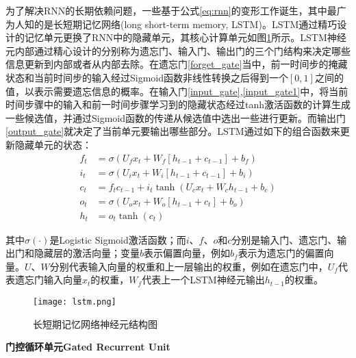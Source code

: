 为了解决RNN的长期依赖问题，一些基于公式\ref{eq:rnn}的变形工作诞生，其中最广为人知的是长短期记忆网络(long short-term memory, LSTM)。LSTM通过精巧设计的记忆单元更换了RNN中的隐藏单元，其核心计算单元如图\ref{fig:lstm}所示。LSTM神经元内部通过精心设计的分别称为遗忘门、输⼊门、输出门的三个门结构来决定哪些信息更新到内部或者从内部去除。在遗忘门\eqref{forget_gate}当中，前一时间步的掩藏状态和当前时间步的输入经过Sigmoid函数非线性转换之后得到一个$[0,1]$之间的值，以表示需要遗忘信息的概率。在输入门\eqref{input_gate},\eqref{input_gate1}中，将当前时间步骤中的输入和前一时间步骤学习到的隐藏状态经过tanh激活函数的计算生成一些候选值，并通过Sigmoid函数的传递从候选值中选出一些进行更新。而输出门\eqref{output_gate}就决定了当前单元要输出哪些部分。LSTM通过如下的组合函数来更新隐藏单元的状态：
  \begin{align} 
  f_{t} &=\sigma(U_{f} x_{t}+W_{f}[h_{t-1}+ c_{t-1}] +b_{f}) \label{forget_gate}\\
  i_{t} &=\sigma(U_{i} x_{t}+W_{i}[h_{t-1}+ c_{t-1}]+b_{i}) \label{input_gate}\\  
  c_{t} &=f_{t} c_{t-1}+i_{t} \tanh (U_{c} x_{t}+W_{c} h_{t-1}+b_{c}) \label{input_gate1}\\ 
  o_{t} &=\sigma(U_{o} x_{t}+W_{o}[h_{t-1}+ c_{t}]+b_{o}) \label{output_gate}\\ 
  h_{t} &=o_{t} \tanh (c_{t}) 
  \end{align}

其中$\sigma(\cdot)$是Logistic Sigmoid激活函数；而$i$、$f$、$o$和$c$分别是输入门、遗忘门、输出门和隐藏层的激活向量；变量$b$表示偏置向量，例如$b_{f}$表示为遗忘门的偏置向量。$U$、$W$分别代表输入向量的权重和上一层输出的权重，例如在遗忘门中，$U_{f}$代表遗忘门输入向量$x_{t}$的权重，$W_{f}$代表上一个LSTM神经元输出$h_{t-1}$的权重。

\begin{figure}[htb]
  \centering
  \texttt{[image: lstm.png]}\\
  \caption{长短期记忆网络神经元结构图}
  \label{fig:lstm}
\end{figure}

\textbf{门控循环单元Gated Recurrent Unit}

